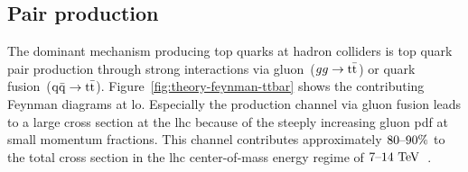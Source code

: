 \subsection{Pair production}
\label{sec:theory-ttbar-production}

The dominant mechanism producing top quarks at hadron colliders is top quark pair production through strong interactions via gluon~($gg\to\mathrm{t}\bar{\mathrm{t}}$) or quark fusion~($\mathrm{q}\bar{\mathrm{q}}\to\mathrm{t}\bar{\mathrm{t}}$). Figure~\ref{fig:theory-feynman-ttbar} shows the contributing Feynman diagrams at \gls{lo}. Especially the production channel via gluon fusion leads to a large cross section at the \gls{lhc} because of the steeply increasing gluon \gls{pdf} at small momentum fractions. This channel contributes approximately $80\text{--}90\%$ to the total cross section in the \gls{lhc} center-of-mass energy regime of $7\text{--}14~\mathrm{TeV}$~\cite{Olive:2016xmw}. 


